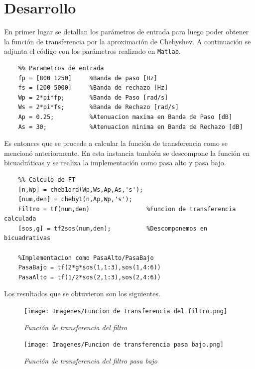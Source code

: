 \documentclass[12pt,A4paper,titlepage]{article}
\begin{document}
\newpage
\section{Desarrollo}

\hspace{1mm} En primer lugar se detallan los parámetros de entrada para luego poder obtener la función de transferencia por la aproximación de Chebyshev. A continuación se adjunta el código con los parámetros realizado en \texttt{Matlab}.

\begin{verbatim}
    %% Parametros de entrada
    fp = [800 1250]     %Banda de paso [Hz]
    fs = [200 5000]     %Banda de rechazo [Hz]
    Wp = 2*pi*fp;       %Banda de Paso [rad/s]
    Ws = 2*pi*fs;       %Banda de Rechazo [rad/s]
    Ap = 0.25;          %Atenuacion maxima en Banda de Paso [dB]
    As = 30;            %Atenuacion minima en Banda de Rechazo [dB]
\end{verbatim}

\hspace{1mm} Es entonces que se procede a calcular la función de transferencia como se mencionó anteriormente. En esta instancia también se descompone la función en bicuadráticas y se realiza la implementación como pasa alto y pasa bajo.

\begin{verbatim}
    %% Calculo de FT
    [n,Wp] = cheb1ord(Wp,Ws,Ap,As,'s');
    [num,den] = cheby1(n,Ap,Wp,'s');
    Filtro = tf(num,den)                %Funcion de transferencia calculada
    [sos,g] = tf2sos(num,den);          %Descomponemos en bicuadrativas
    
    %Implementacion como PasaAlto/PasaBajo
    PasaBajo = tf(2*g*sos(1,1:3),sos(1,4:6))
    PasaAlto = tf(1/2*sos(2,1:3),sos(2,4:6))
\end{verbatim}

\hspace{1mm} Los resultados que se obtuvieron son los siguientes.

\begin{figure}[!h] 
  \centering
  \texttt{[image: Imagenes/Funcion de transferencia del filtro.png]}
  \caption{\textit{Función de transferencia del filtro}}
\end{figure}

\begin{figure}[!h] 
  \centering
  \texttt{[image: Imagenes/Funcion de transferencia pasa bajo.png]}
  \caption{\textit{Función de transferencia del filtro pasa bajo}}
\end{figure}
\end{document}
